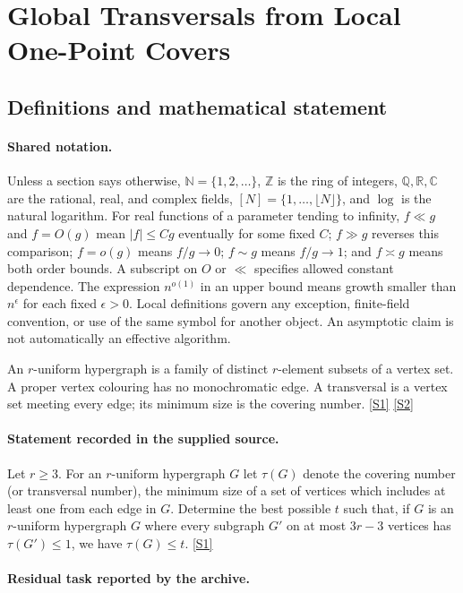 \documentclass[11pt,a4paper]{article}
\newcommand{\N}{\mathbb{N}}
\newcommand{\Z}{\mathbb{Z}}
\newcommand{\Q}{\mathbb{Q}}
\newcommand{\R}{\mathbb{R}}
\newcommand{\C}{\mathbb{C}}
\newcommand{\sref}[2]{\hyperlink{source:#1:#2}{[S#2]}}
\begin{document}
\section{Global Transversals from Local One-Point Covers}\label{statement}


\subsection{Definitions and mathematical statement}

\paragraph{Shared notation.}Unless a section says otherwise, $\N=\{1,2,\ldots\}$,
$\Z$ is the ring of integers, $\Q,\R,\C$ are the rational, real, and complex
fields, $[N]=\{1,\ldots,\lfloor N\rfloor\}$, and $\log$ is the natural
logarithm. For real functions of a parameter tending to infinity,
$f\ll g$ and $f=O(g)$ mean $|f|\leq Cg$ eventually for some fixed $C$;
$f\gg g$ reverses this comparison; $f=o(g)$ means $f/g\to0$;
$f\sim g$ means $f/g\to1$; and $f\asymp g$ means both order bounds.
A subscript on $O$ or $\ll$ specifies allowed constant dependence.
The expression $n^{o(1)}$ in an upper bound means growth smaller than
$n^\epsilon$ for each fixed $\epsilon>0$. Local definitions govern any
exception, finite-field convention, or use of the same symbol for another
object. An asymptotic claim is not automatically an effective algorithm.



An $r$-uniform hypergraph is a family of distinct $r$-element subsets of a vertex set. A proper vertex colouring has no monochromatic edge. A transversal is a vertex set meeting every edge; its minimum size is the covering number. \sref{statement}{1} \sref{statement}{2}

\paragraph{Statement recorded in the supplied source.}
Let $r\geq 3$. For an $r$-uniform hypergraph $G$ let $\tau(G)$ denote the covering number (or transversal number), the minimum size of a set of vertices which includes at least one from each edge in $G$.
Determine the best possible $t$ such that, if $G$ is an $r$-uniform hypergraph $G$ where every subgraph $G'$ on at most $3r-3$ vertices has $\tau(G')\leq 1$, we have $\tau(G)\leq t$. \sref{statement}{1}

\paragraph{Residual task reported by the archive.}
\end{document}

